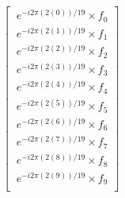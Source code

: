 \documentclass[preview]{standalone}
\begin{document}
\begin{align*}
\left[\begin{array}{l}\
            e^{-i 2 \pi(2(0)) / 19  } \times  f_{0}\\\
            e^{-i 2 \pi(2(1)) / 19  } \times  f_{1}\\\
            e^{-i 2 \pi(2(2)) / 19  } \times  f_{2}\\\
            e^{-i 2 \pi(2(3)) / 19  } \times  f_{3}\\\
            e^{-i 2 \pi(2(4)) / 19  } \times  f_{4}\\\
            e^{-i 2 \pi(2(5)) / 19  } \times  f_{5}\\\
            e^{-i 2 \pi(2(6)) / 19  } \times  f_{6}\\\
            e^{-i 2 \pi(2(7)) / 19  } \times  f_{7}\\\
            e^{-i 2 \pi(2(8)) / 19  } \times  f_{8}\\\
            e^{-i 2 \pi(2(9)) / 19  } \times  f_{9}\\\
            \end{array}\right]
\end{align*}
\end{document}
